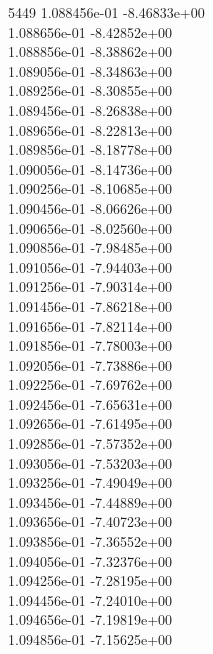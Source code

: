 5449	1.088456e-01	-8.46833e+00	\\ 	1.088656e-01	-8.42852e+00	\\ 	1.088856e-01	-8.38862e+00	\\ 	1.089056e-01	-8.34863e+00	\\ 	1.089256e-01	-8.30855e+00	\\ 	1.089456e-01	-8.26838e+00	\\ 	1.089656e-01	-8.22813e+00	\\ 	1.089856e-01	-8.18778e+00	\\ 	1.090056e-01	-8.14736e+00	\\ 	1.090256e-01	-8.10685e+00	\\ 	1.090456e-01	-8.06626e+00	\\ 	1.090656e-01	-8.02560e+00	\\ 	1.090856e-01	-7.98485e+00	\\ 	1.091056e-01	-7.94403e+00	\\ 	1.091256e-01	-7.90314e+00	\\ 	1.091456e-01	-7.86218e+00	\\ 	1.091656e-01	-7.82114e+00	\\ 	1.091856e-01	-7.78003e+00	\\ 	1.092056e-01	-7.73886e+00	\\ 	1.092256e-01	-7.69762e+00	\\ 	1.092456e-01	-7.65631e+00	\\ 	1.092656e-01	-7.61495e+00	\\ 	1.092856e-01	-7.57352e+00	\\ 	1.093056e-01	-7.53203e+00	\\ 	1.093256e-01	-7.49049e+00	\\ 	1.093456e-01	-7.44889e+00	\\ 	1.093656e-01	-7.40723e+00	\\ 	1.093856e-01	-7.36552e+00	\\ 	1.094056e-01	-7.32376e+00	\\ 	1.094256e-01	-7.28195e+00	\\ 	1.094456e-01	-7.24010e+00	\\ 	1.094656e-01	-7.19819e+00	\\ 	1.094856e-01	-7.15625e+00	\\ \hline
